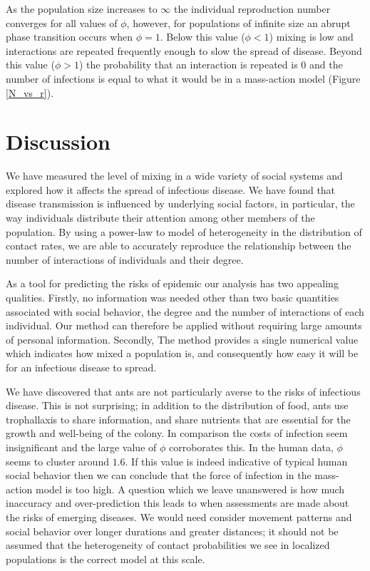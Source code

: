 \documentclass[10pt]{article}
\begin{document}
\begin{multicols}{2}
As the population size increases to $\infty$ the individual reproduction number converges for all values of $\phi$, however, for populations of infinite size an abrupt phase transition occurs when $\phi=1$. Below this value ($\phi<1$) mixing is low and interactions are repeated frequently enough to slow the spread of disease. Beyond this value ($\phi>1$) the probability that an interaction is repeated is $0$ and the number of infections is equal to what it would be in a mass-action model (Figure \ref{N_vs_r}).


\section{Discussion}
We have measured the level of mixing in a wide variety of social systems and explored how it affects the spread of infectious disease. We have found that disease transmission is influenced by underlying social factors, in particular, the way individuals distribute their attention among other members of the population. By using a power-law to model of heterogeneity in the distribution of contact rates, we are able to accurately reproduce the relationship between the number of interactions of individuals and their degree. 

As a tool for predicting the risks of epidemic our analysis has two appealing qualities. Firstly, no information was needed other than two basic quantities associated with social behavior, the degree and the number of interactions of each individual. Our method can therefore be applied without requiring large amounts of personal information. Secondly, The method provides a single numerical value which indicates how mixed a population is, and consequently how easy it will be for an infectious disease to spread.

We have discovered that ants are not particularly averse to the risks of infectious disease. This is not surprising; in addition to the distribution of food, ants use trophallaxis to share information, and share nutrients that are essential for the growth and well-being of the colony. In comparison the costs of infection seem insignificant and the large value of $\phi$ corroborates this. In the human data, $\phi$ seems to cluster around $1.6$. If this value is indeed indicative of typical human social behavior then we can conclude that the force of infection in the mass-action model is too high. A question which we leave unanswered is how much inaccuracy and over-prediction this leads to when assessments are made about the risks of emerging diseases. We would need consider movement patterns and social behavior over longer durations and greater distances; it should not be assumed that the heterogeneity of contact probabilities we see in localized populations is the correct model at this scale.


\end{multicols}
\end{document}
